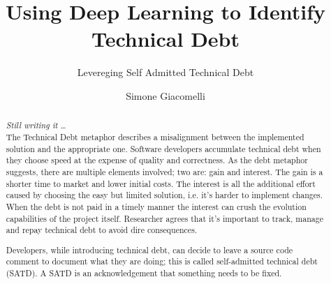 \documentclass[11pt, mscthesis]{usiinfthesis}
\title{Using Deep Learning to Identify Technical Debt} %
\subtitle{Levereging Self Admitted Technical Debt} %
\author{Simone Giacomelli} %
\begin{document}
\maketitle %

\frontmatter %

\begin{abstract}
\textit{Still writing it} \dots
\\
The Technical Debt metaphor describes a misalignment between the implemented solution and the appropriate one. Software developers accumulate technical debt when they choose speed at the expense of quality and correctness. As the debt metaphor suggests, there are multiple elements involved; two are: gain and interest. The gain is a shorter time to market and lower initial costs. The interest is all the additional effort caused by choosing the easy but limited solution, i.e. it's harder to implement changes. When the debt is not paid in a timely manner the interest can crush the evolution capabilities of the project itself. Researcher agrees that it's important to track, manage and repay technical debt to avoid dire consequences.

Developers, while introducing technical debt, can decide to leave a source code comment to document what they are doing; this is called self-admitted technical debt (SATD). A SATD is an acknowledgement that something needs to be fixed.




\end{abstract}
\end{document}
